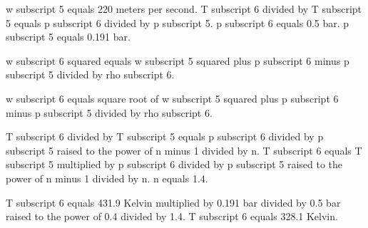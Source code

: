 w subscript 5 equals 220 meters per second.  
T subscript 6 divided by T subscript 5 equals p subscript 6 divided by p subscript 5.  
p subscript 6 equals 0.5 bar.  
p subscript 5 equals 0.191 bar.  

w subscript 6 squared equals w subscript 5 squared plus p subscript 6 minus p subscript 5 divided by rho subscript 6.  

w subscript 6 equals square root of w subscript 5 squared plus p subscript 6 minus p subscript 5 divided by rho subscript 6.  

T subscript 6 divided by T subscript 5 equals p subscript 6 divided by p subscript 5 raised to the power of n minus 1 divided by n.  
T subscript 6 equals T subscript 5 multiplied by p subscript 6 divided by p subscript 5 raised to the power of n minus 1 divided by n.  
n equals 1.4.  

T subscript 6 equals 431.9 Kelvin multiplied by 0.191 bar divided by 0.5 bar raised to the power of 0.4 divided by 1.4.  
T subscript 6 equals 328.1 Kelvin.